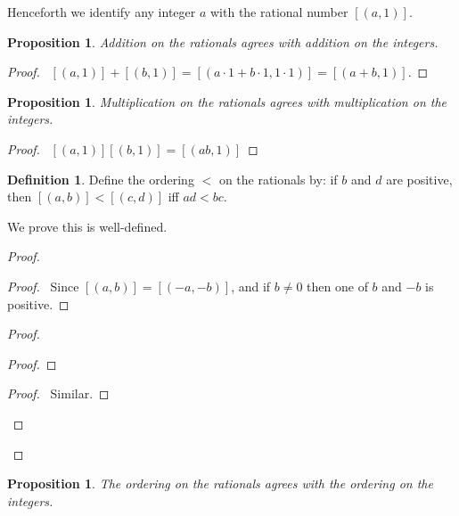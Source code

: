 \documentclass{book}
\let\qed\relax
\newtheorem{prop}[ax]{Proposition}
\theoremstyle{definition}
\newtheorem{df}[ax]{Definition}
\begin{document}
Henceforth we identify any integer $a$ with the rational number $[(a,1)]$.

\begin{prop}
Addition on the rationals agrees with addition on the integers.
\end{prop}

\begin{proof}
\pf\ $[(a,1)] + [(b,1)] = [(a \cdot 1 + b \cdot 1, 1 \cdot 1)] = [(a + b, 1)]$. \qed
\end{proof}

\begin{prop}
Multiplication on the rationals agrees with multiplication on the integers.
\end{prop}

\begin{proof}
\pf\ $[(a,1)][(b,1)] = [(ab,1)]$ \qed
\end{proof}

\begin{df}
Define the ordering $<$ on the rationals by: if $b$ and $d$ are positive, then $[(a,b)] < [(c,d)]$ iff $ad < bc$.

We prove this is well-defined.
\end{df}

\begin{proof}
\pf
{}
\begin{proof}
	\pf\ Since $[(a,b)] = [(-a,-b)]$, and if $b \neq 0$ then one of $b$ and $-b$ is positive.
\end{proof}
\begin{proof}
	\pf
	\begin{proof}
	\end{proof}
	\begin{proof}
		\pf\ Similar.
	\end{proof}
\end{proof}
\qed
\end{proof}

\begin{prop}
The ordering on the rationals agrees with the ordering on the integers.
\end{prop}
\end{document}
